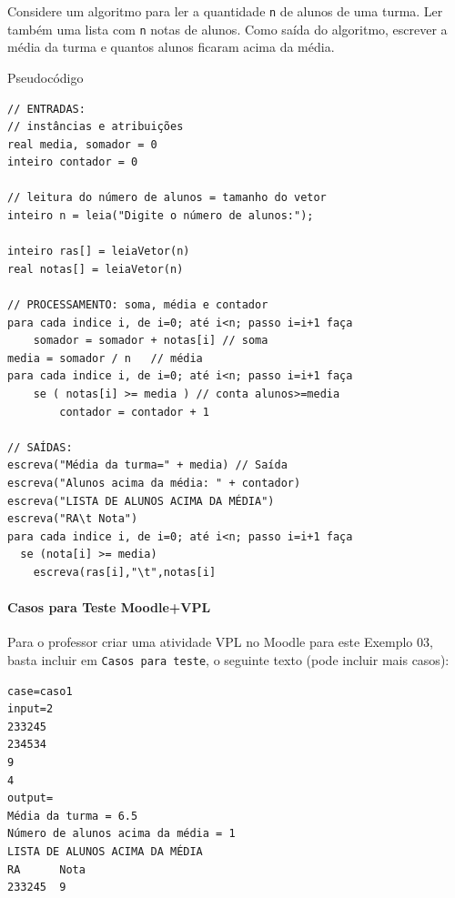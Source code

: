 \documentclass[12pt,a4paper]{article}
\begin{document}
Considere um algoritmo para ler a quantidade \texttt{n} de alunos de uma
turma. Ler também uma lista com \texttt{n} notas de alunos. Como saída
do algoritmo, escrever a média da turma e quantos alunos ficaram acima
da média.

    Pseudocódigo

\begin{verbatim}
// ENTRADAS:
// instâncias e atribuições
real media, somador = 0
inteiro contador = 0

// leitura do número de alunos = tamanho do vetor
inteiro n = leia("Digite o número de alunos:");

inteiro ras[] = leiaVetor(n)
real notas[] = leiaVetor(n)

// PROCESSAMENTO: soma, média e contador
para cada indice i, de i=0; até i<n; passo i=i+1 faça 
    somador = somador + notas[i] // soma
media = somador / n   // média
para cada indice i, de i=0; até i<n; passo i=i+1 faça    
    se ( notas[i] >= media ) // conta alunos>=media
        contador = contador + 1

// SAÍDAS:
escreva("Média da turma=" + media) // Saída
escreva("Alunos acima da média: " + contador)
escreva("LISTA DE ALUNOS ACIMA DA MÉDIA")
escreva("RA\t Nota")
para cada indice i, de i=0; até i<n; passo i=i+1 faça 
  se (nota[i] >= media)
    escreva(ras[i],"\t",notas[i]
\end{verbatim}

    \hypertarget{casos-para-teste-moodlevpl}{%
\paragraph{Casos para Teste
Moodle+VPL}\label{casos-para-teste-moodlevpl}}

Para o professor criar uma atividade VPL no Moodle para este Exemplo 03,
basta incluir em \texttt{Casos\ para\ teste}, o seguinte texto (pode
incluir mais casos):

\begin{verbatim}
case=caso1
input=2
233245
234534
9
4
output= 
Média da turma = 6.5
Número de alunos acima da média = 1
LISTA DE ALUNOS ACIMA DA MÉDIA
RA      Nota
233245  9
\end{verbatim}
\end{document}
